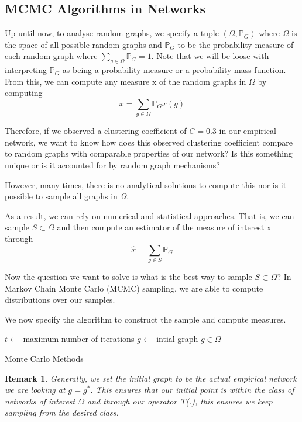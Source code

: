 \documentclass[twoside]{article}
\newcommand{\prob}{\mathbb{P}}
\newtheorem{remark}[theorem]{Remark}
\begin{document}
\subsection{MCMC Algorithms in Networks}

Up until now, to analyse random graphs, we specify a tuple $(\Omega, \mathbb{P}_G)$ where $\Omega$ is the space of all possible random graphs and $\mathbb{P}_G$ to be the probability measure of each random graph where $\sum_{g \in \Omega}\prob_G = 1.$ Note that we will be loose with interpreting $\prob_G$ as being a probability measure or a probability mass function. From this, we can compute any measure x of the random graphs in $\Omega$ by computing 
$$
x = \sum_{g \in \Omega}\prob_Gx(g)
$$

Therefore, if we observed a clustering coefficient of $C = 0.3$ in our empirical network, we want to know how does this observed clustering coefficient compare to random graphs with comparable properties of our network? Is this something unique or is it accounted for by random graph mechanisms?

However, many times, there is no analytical solutions to compute this nor is it possible to sample all graphs in $\Omega.$

As a result, we can rely on numerical and statistical approaches. That is, we can sample $S \subset \Omega$ and then compute an estimator of the measure of interest x through 
$$
\hat{x} = \sum_{g \in S}\mathbb{P}_G
$$

Now the question we want to solve is what is the best way to sample $S \subset \Omega?$ In Markov Chain Monte Carlo (MCMC) sampling, we are able to compute distributions over our samples. 

We now specify the algorithm to construct the sample and compute measures.
\begin{algorithm}
\DontPrintSemicolon
{}

$t \gets$ maximum number of iterations\;
$g \gets$ intial graph $g \in \Omega$\;
\caption{{\sc Monte Carlo Methods}}
\label{algo:duplicate}
\end{algorithm}

\begin{remark} Generally, we set the initial graph to be the actual empirical network we are looking at $g = g^*$. This ensures that our initial point is within the class of networks of interest $\Omega$ and through our operator T(.), this ensures we keep sampling from the desired class.
\end{remark}
\end{document}

